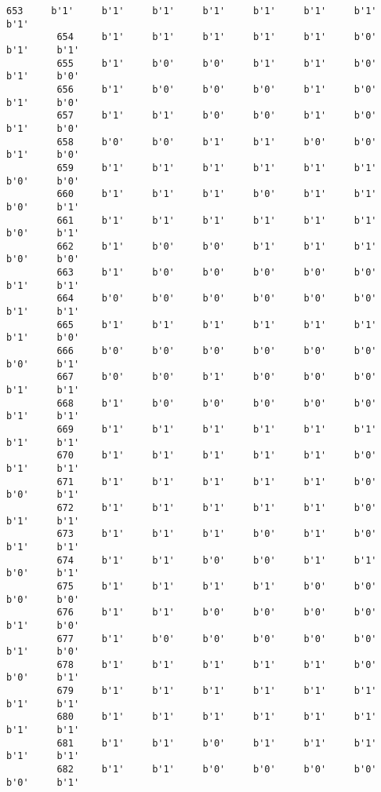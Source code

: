 \documentclass[11pt]{article}
\begin{document}
\begin{Verbatim}[commandchars=\\\{\}]
         653     b'1'     b'1'     b'1'     b'1'     b'1'     b'1'     b'1'     b'1'   
         654     b'1'     b'1'     b'1'     b'1'     b'1'     b'0'     b'1'     b'1'   
         655     b'1'     b'0'     b'0'     b'1'     b'1'     b'0'     b'1'     b'0'   
         656     b'1'     b'0'     b'0'     b'0'     b'1'     b'0'     b'1'     b'0'   
         657     b'1'     b'1'     b'0'     b'0'     b'1'     b'0'     b'1'     b'0'   
         658     b'0'     b'0'     b'1'     b'1'     b'0'     b'0'     b'1'     b'0'   
         659     b'1'     b'1'     b'1'     b'1'     b'1'     b'1'     b'0'     b'0'   
         660     b'1'     b'1'     b'1'     b'0'     b'1'     b'1'     b'0'     b'1'   
         661     b'1'     b'1'     b'1'     b'1'     b'1'     b'1'     b'0'     b'1'   
         662     b'1'     b'0'     b'0'     b'1'     b'1'     b'1'     b'0'     b'0'   
         663     b'1'     b'0'     b'0'     b'0'     b'0'     b'0'     b'1'     b'1'   
         664     b'0'     b'0'     b'0'     b'0'     b'0'     b'0'     b'1'     b'1'   
         665     b'1'     b'1'     b'1'     b'1'     b'1'     b'1'     b'1'     b'0'   
         666     b'0'     b'0'     b'0'     b'0'     b'0'     b'0'     b'0'     b'1'   
         667     b'0'     b'0'     b'1'     b'0'     b'0'     b'0'     b'1'     b'1'   
         668     b'1'     b'0'     b'0'     b'0'     b'0'     b'0'     b'1'     b'1'   
         669     b'1'     b'1'     b'1'     b'1'     b'1'     b'1'     b'1'     b'1'   
         670     b'1'     b'1'     b'1'     b'1'     b'1'     b'0'     b'1'     b'1'   
         671     b'1'     b'1'     b'1'     b'1'     b'1'     b'0'     b'0'     b'1'   
         672     b'1'     b'1'     b'1'     b'1'     b'1'     b'0'     b'1'     b'1'   
         673     b'1'     b'1'     b'1'     b'0'     b'1'     b'0'     b'1'     b'1'   
         674     b'1'     b'1'     b'0'     b'0'     b'1'     b'1'     b'0'     b'1'   
         675     b'1'     b'1'     b'1'     b'1'     b'0'     b'0'     b'0'     b'0'   
         676     b'1'     b'1'     b'0'     b'0'     b'0'     b'0'     b'1'     b'0'   
         677     b'1'     b'0'     b'0'     b'0'     b'0'     b'0'     b'1'     b'0'   
         678     b'1'     b'1'     b'1'     b'1'     b'1'     b'0'     b'0'     b'1'   
         679     b'1'     b'1'     b'1'     b'1'     b'1'     b'1'     b'1'     b'1'   
         680     b'1'     b'1'     b'1'     b'1'     b'1'     b'1'     b'1'     b'1'   
         681     b'1'     b'1'     b'0'     b'1'     b'1'     b'1'     b'1'     b'1'   
         682     b'1'     b'1'     b'0'     b'0'     b'0'     b'0'     b'0'     b'1'   

\end{Verbatim}
\end{document}
